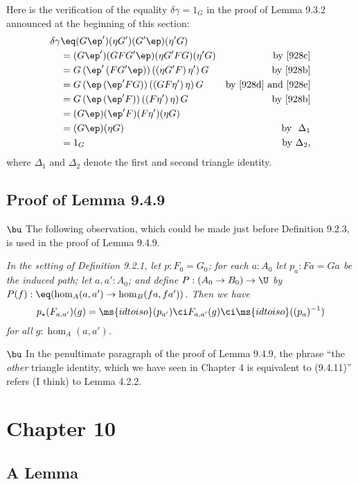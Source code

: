\documentclass[12pt]{article}
\begin{document}
Here is the verification of the equality $\delta\gamma=1_G$ in the proof of Lemma 9.3.2 announced at the beginning of this section: 
\begin{align*}
\delta\gamma &\eq(G\ep')(\eta G')(G'\ep)(\eta'G)\\
&=(G\ep')(G F G'\ep)(\eta G' F G)(\eta'G)&\text{by \eqref{928c}}\\
&=G\,(\ep'\,(FG'\ep))\,((\eta G'F)\,\eta')\,G&\text{by \eqref{928b}}\\
&=G\,(\ep\,(\ep'FG))\,((GF\eta')\,\eta)\,G&\text{by \eqref{928d} and \eqref{928e}}\\
&=G\,(\ep\,(\ep'F))\,((F\eta')\,\eta)\,G&\text{by \eqref{928b}}\\
&=(G\ep)(\ep' F)(F\eta')(\eta G)\\
&=(G\ep)(\eta G)&\text{by $\ \Delta_1$}\\
&=1_G&\text{by $\Delta_2$,}
\end{align*} 
where $\Delta_1$ and $\Delta_2$ denote the first and second triangle identity.


\subsection{Proof of Lemma 9.4.9}

$\bu$ The following observation, which could be made just before Definition 9.2.3, is used in the proof of Lemma 9.4.9.

\emph{In the setting of Definition 9.2.1, let $p:F_0=G_0$; for each $a:A_0$ let $p_a:Fa=Ga$ be the induced path; let $a,a':A_0$; and define $P:(A_0\to B_0)\to\U$ by $P(f):\eq(\hom_A(a,a')\to\hom_B(fa,fa'))$. Then we have} 
$$
p_\star(F_{a,a'})(g)=\ms{idtoiso}(p_{a'})\ci F_{a,a'}(g)\ci\ms{idtoiso}((p_a)^{-1})
$$ 
\emph{for all $g:\hom_A(a,a')$.}

\nn$\bu$ In the penultimate paragraph of the proof of Lemma 9.4.9, the phrase ``the \emph{other} triangle identity, which we have seen in Chapter 4 is equivalent to (9.4.11)'' refers (I think) to Lemma 4.2.2.


\section{Chapter 10}

\subsection{A Lemma}\label{imfmp}
\end{document}
